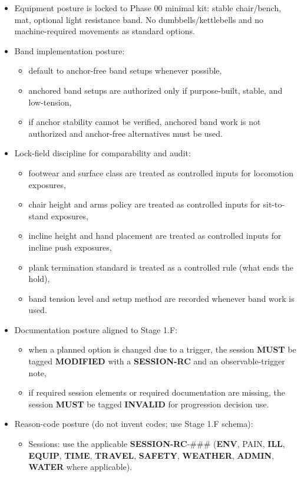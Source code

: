 \documentclass[10pt]{article}
\begin{document}
\begin{itemize}
\begin{itemize}
  \end{itemize}
\item Equipment posture is locked to Phase 00 minimal kit: stable chair/bench, mat, optional light resistance band. No dumbbells/kettlebells and no machine-required movements as standard options.
\item Band implementation posture:
  \begin{itemize}
  \item default to anchor-free band setups whenever possible,
  \item anchored band setups are authorized only if purpose-built, stable, and low-tension,
  \item if anchor stability cannot be verified, anchored band work is not authorized and anchor-free alternatives must be used.
  \end{itemize}
\item Lock-field discipline for comparability and audit:
  \begin{itemize}
  \item footwear and surface class are treated as controlled inputs for locomotion exposures,
  \item chair height and arms policy are treated as controlled inputs for sit-to-stand exposures,
  \item incline height and hand placement are treated as controlled inputs for incline push exposures,
  \item plank termination standard is treated as a controlled rule (what ends the hold),
  \item band tension level and setup method are recorded whenever band work is used.
  \end{itemize}
\item Documentation posture aligned to Stage 1.F:
  \begin{itemize}
  \item when a planned option is changed due to a trigger, the session \textbf{MUST} be tagged \textbf{MODIFIED} with a \textbf{SESSION-RC} and an observable-trigger note,
  \item if required session elements or required documentation are missing, the session \textbf{MUST} be tagged \textbf{INVALID} for progression decision use.
  \end{itemize}
\item Reason-code posture (do not invent codes; use Stage 1.F schema):
  \begin{itemize}
  \item Sessions: use the applicable \textbf{SESSION-RC}-\#\#\# (\textbf{ENV}, PAIN, \textbf{ILL}, \textbf{EQUIP}, \textbf{TIME}, \textbf{TRAVEL}, \textbf{SAFETY}, \textbf{WEATHER}, \textbf{ADMIN}, \textbf{WATER} where applicable).

\end{itemize}
\end{itemize}
\end{document}
